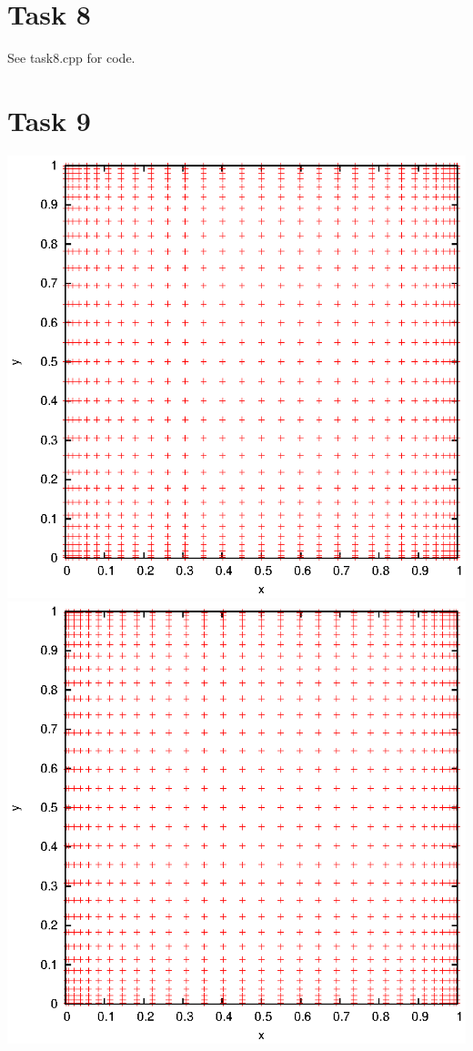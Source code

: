 \documentclass[]{article}
\begin{document}
\section*{Task 8}
See task8.cpp for code.

\section*{Task 9}
\includegraphics{task9_gauss}\\
\includegraphics{task9_cc}\\
\end{document}
